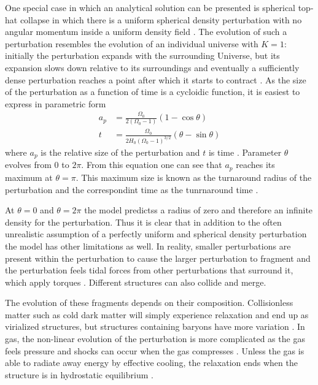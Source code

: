\documentclass[english, oneside]{HYgradu}
\begin{document}
One special case in which an analytical solution can be presented is spherical top-hat collapse in which there is a uniform spherical density perturbation with no angular momentum inside a uniform density field \citep{longair2008galaxy}. The evolution of such a perturbation resembles the evolution of an individual universe with $K = 1$: initially the perturbation expands with the surrounding Universe, but its expansion slows down relative to its surroundings and eventually a sufficiently dense perturbation reaches a point after which it starts to contract \citep{longair2008galaxy}. As the size of the perturbation as a function of time is a cycloidic function, it is easiest to express in parametric form
\begin{align}
a_p &= \frac{\Omega_0}{2(\Omega_0-1)}(1-\cos\theta) \\
t &= \frac{\Omega_0}{2H_0(\Omega_0-1)^{3/2}}(\theta - \sin\theta)
\end{align}
where $a_p$ is the relative size of the perturbation and $t$ is time \citep{longair2008galaxy}. Parameter $\theta$ evolves from 0 to $2\pi$. From this equation one can see that $a_p$ reaches its maximum at $\theta = \pi$. This maximum size is known as the turnaround radius of the perturbation and the correspondint time as the tunrnaround time \citep{mo2010galaxy}.

At $\theta=0$ and $\theta = 2\pi$ the model predictss a radius of zero and therefore an infinite density for the perturbation. Thus it is clear that in addition to the often unrealistic assumption of a perfectly uniform and spherical density perturbation the model has other limitations as well. In reality, smaller perturbations are present within the perturbation to cause the larger perturbation to fragment and the perturbation feels tidal forces from other perturbations that surround it, which apply torques \citep{longair2008galaxy}. Different structures can also collide and merge.

The evolution of these fragments depends on their composition. Collisionless matter such as cold dark matter will simply experience relaxation and end up as virialized structures, but structures containing baryons have more variation \citep{mo2010galaxy}. In gas, the non-linear evolution of the perturbation is more complicated as the gas feels pressure and shocks can occur when the gas compresses \citep{mo2010galaxy}. Unless the gas is able to radiate away energy by effective cooling, the relaxation ends when the structure is in hydrostatic equilibrium \citep{mo2010galaxy}.
\end{document}
